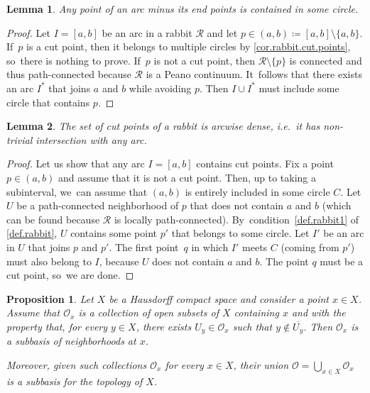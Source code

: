 \documentclass[10pt,a4paper]{amsart}
\newcommand{\ie}{i.e.\ }
\newtheorem{lemma}[lemma]{Lemma}
\newtheorem{proposition}[proposition]{Proposition}
\theoremstyle{definition}
\newcommand{\R}{\mathcal{R}}
\begin{document}
\begin{lemma}
\label{lem.rabbit.arcs.and.circles}
Any point of an arc minus its end points is contained in some circle.
\end{lemma}

\begin{proof}
Let $I = [a,b]$ be an arc in a rabbit $\R$ and let $p \in (a,b) \coloneqq [a,b] \setminus \{a,b\}$. If~$p$ is a cut point, then it belongs to multiple circles by \cref{cor.rabbit.cut.points}, so~there is nothing to prove. If~$p$ is not a cut point, then $\R \setminus \{p\}$ is connected and thus path-connected because $\R$ is a Peano continuum. It~follows that there exists an arc $I^*$ that joins $a$ and $b$ while avoiding $p$.
Then $I \cup I^*$ must include some circle that contains $p$.
\end{proof}

\begin{lemma}
The set of cut points of a rabbit is arcwise dense, \ie it has non-trivial intersection with any arc.
\end{lemma}

\begin{proof}
Let us show that any arc $I=[a,b]$ contains cut points.
Fix a point $p \in (a,b)$ and assume that it is not a cut point.
Then, up to taking a subinterval, we~can assume that $(a,b)$ is entirely included in some circle $C$.
Let $U$ be a path-connected neighborhood of $p$ that does not contain $a$ and $b$ (which can be found because $\R$ is locally path-connected). By~condition~\cref{def.rabbit1} of \cref{def.rabbit}, $U$ contains some point $p'$ that belongs to some circle.
Let $I'$ be an arc in $U$ that joins $p$ and $p'$.
The first point~$q$ in which $I'$ meets $C$ (coming from $p'$) must also belong to $I$, because $U$ does not contain $a$ and $b$.
The point $q$ must be a cut point, so~we are done.
\end{proof}

\begin{proposition}
\label{prop.subbasis}
Let $X$ be a Hausdorff compact space and consider a point $x \in X$.
Assume that $\mathcal{O}_x$ is a collection of open subsets of $X$ containing $x$ and with the property that, for every $y \in X$, there exists $U_y \in \mathcal{O}_x$ such that $y \notin \overline{U_y}$.
Then $\mathcal{O}_x$ is a subbasis of neighborhoods at $x$.

Moreover, given such collections $\mathcal{O}_x$ for every $x \in X$, their union $\mathcal{O} = \bigcup_{x \in X} \mathcal{O}_x$ is a subbasis for the topology of $X$.
\end{proposition}
\end{document}
